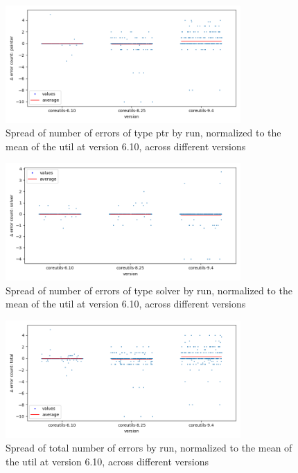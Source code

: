 \documentclass{article}
\begin{document}
\begin{figure}[htbp]
    \centering
    \includegraphics[width=0.8\textwidth]{../plots/num_errors (ptr)/changes-by-version.png}
    \captionsetup{width=0.6\textwidth}
    \caption{Spread of number of errors of type ptr by run, normalized to the mean of the util at version 6.10, across different versions}
\end{figure}
\begin{figure}[htbp]
    \centering
    \includegraphics[width=0.8\textwidth]{../plots/num_errors (solver)/changes-by-version.png}
    \captionsetup{width=0.6\textwidth}
    \caption{Spread of number of errors of type solver by run, normalized to the mean of the util at version 6.10, across different versions}
\end{figure}
\begin{figure}[htbp]
    \centering
    \includegraphics[width=0.8\textwidth]{../plots/num_errors (total)/changes-by-version.png}
    \captionsetup{width=0.6\textwidth}
    \caption{Spread of total number of errors by run, normalized to the mean of the util at version 6.10, across different versions}
\end{figure}
\end{document}
